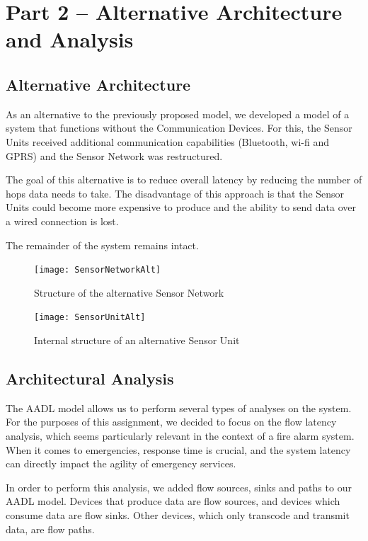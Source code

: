 \section{Part 2 -- Alternative Architecture and Analysis}

\subsection{Alternative Architecture}

As an alternative to the previously proposed model, we developed a model of a system that functions without the Communication Devices.
For this, the Sensor Units received additional communication capabilities (Bluetooth, wi-fi and GPRS) and the Sensor Network was restructured.

The goal of this alternative is to reduce overall latency by reducing the number of hops data needs to take.
The disadvantage of this approach is that the Sensor Units could become more expensive to produce and the ability to send data over a wired connection is lost.

The remainder of the system remains intact. 

\begin{figure}[h]
\caption{Structure of the alternative Sensor Network}
\label{fig:sensornetworkalt}
\centering
\texttt{[image: SensorNetworkAlt]}
\end{figure}

\begin{figure}[h]
\caption{Internal structure of an alternative Sensor Unit}
\label{fig:sensorunitalt}
\centering
\texttt{[image: SensorUnitAlt]}
\end{figure}

\subsection{Architectural Analysis}

The AADL model allows us to perform several types of analyses on the system. For the purposes of this assignment, we decided to focus on the flow latency analysis, which seems particularly relevant in the context of a fire alarm system. When it comes to emergencies, response time is crucial, and the system latency can directly impact the agility of emergency services.

In order to perform this analysis, we added flow sources, sinks and paths to our AADL model. Devices that produce data are flow sources, and devices which consume data are flow sinks. Other devices, which only transcode and transmit data, are flow paths. 

